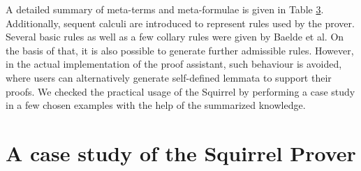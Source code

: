 \documentclass[conference]{IEEEtran}
\begin{document}
A detailed summary of meta-terms and meta-formulae is given in Table \hyperref[table:3]{3}.\\
Additionally, sequent calculi are introduced to represent rules used by the prover. Several basic rules as well as a few collary rules were given by Baelde et al. On the basis of that, it is also possible to generate further admissible rules. However, in the actual implementation of the proof assistant, such behaviour is avoided, where users can alternatively generate self-defined lemmata to support their proofs. We checked the practical usage of the Squirrel by performing a case study in a few chosen examples with the help of the summarized knowledge.

\section{A case study of the Squirrel Prover}
\label{sec:squirrel}
\end{document}
